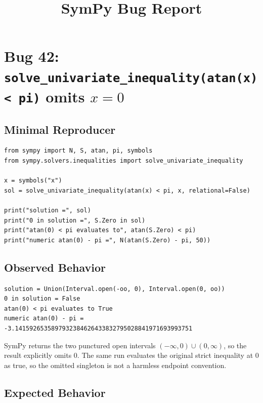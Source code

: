 \documentclass[11pt]{article}
\title{SymPy Bug Report}
\author{}
\date{}
\begin{document}
\maketitle

\section{Bug 42: \texorpdfstring{\texttt{solve\_univariate\_inequality(atan(x) < pi)}}{solve\_univariate\_inequality(atan(x) < pi)} omits \texorpdfstring{\(x=0\)}{x=0}}

\subsection{Minimal Reproducer}

\medskip

\begin{lstlisting}[style=bugpython]
from sympy import N, S, atan, pi, symbols
from sympy.solvers.inequalities import solve_univariate_inequality

x = symbols("x")
sol = solve_univariate_inequality(atan(x) < pi, x, relational=False)

print("solution =", sol)
print("0 in solution =", S.Zero in sol)
print("atan(0) < pi evaluates to", atan(S.Zero) < pi)
print("numeric atan(0) - pi =", N(atan(S.Zero) - pi, 50))
\end{lstlisting}

\subsection{Observed Behavior}

\medskip

\begin{lstlisting}[style=bugpython]
solution = Union(Interval.open(-oo, 0), Interval.open(0, oo))
0 in solution = False
atan(0) < pi evaluates to True
numeric atan(0) - pi = -3.1415926535897932384626433832795028841971693993751
\end{lstlisting}

SymPy returns the two punctured open intervals
\((-\infty,0)\cup(0,\infty)\), so the result explicitly omits \(0\).  The
same run evaluates the original strict inequality at \(0\) as true, so the
omitted singleton is not a harmless endpoint convention.

\subsection{Expected Behavior}
\end{document}
